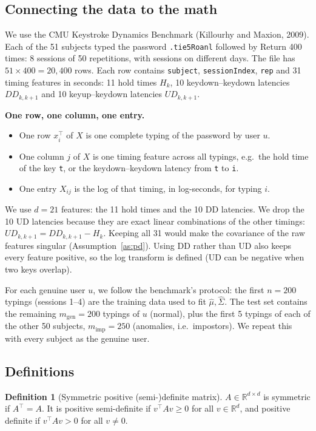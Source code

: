 \documentclass[11pt]{article}
\theoremstyle{definition}
\newtheorem{definition}[theorem]{Definition}
\newcommand{\R}{\mathbb{R}}
\newcommand{\T}{^{\top}}
\begin{document}
\subsection{Connecting the data to the math}
We use the CMU Keystroke Dynamics Benchmark (Killourhy and Maxion, 2009). Each of the 51 subjects typed the password \texttt{.tie5Roanl} followed by Return 400 times: 8 sessions of 50 repetitions, with sessions on different days. The file has $51\times400=20{,}400$ rows. Each row contains \texttt{subject}, \texttt{sessionIndex}, \texttt{rep} and 31 timing features in seconds: 11 hold times $H_k$, 10 keydown--keydown latencies $DD_{k,k+1}$ and 10 keyup--keydown latencies $UD_{k,k+1}$.

\textbf{One row, one column, one entry.}
\begin{itemize}
  \item One row $x_i\T$ of $X$ is one complete typing of the password by user $u$.
  \item One column $j$ of $X$ is one timing feature across all typings, e.g.\ the hold time of the key \texttt{t}, or the keydown--keydown latency from \texttt{t} to \texttt{i}.
  \item One entry $X_{ij}$ is the log of that timing, in log-seconds, for typing $i$.
\end{itemize}

We use $d=21$ features: the 11 hold times and the 10 DD latencies. We drop the 10 UD latencies because they are exact linear combinations of the other timings: $UD_{k,k+1}=DD_{k,k+1}-H_k$. Keeping all 31 would make the covariance of the raw features singular (Assumption~\ref{as:pd}). Using DD rather than UD also keeps every feature positive, so the log transform is defined (UD can be negative when two keys overlap).

For each genuine user $u$, we follow the benchmark's protocol: the first $n=200$ typings (sessions 1--4) are the training data used to fit $\hat\mu,\hat\Sigma$. The test set contains the remaining $m_{\text{gen}}=200$ typings of $u$ (normal), plus the first 5 typings of each of the other 50 subjects, $m_{\text{imp}}=250$ (anomalies, i.e.\ impostors). We repeat this with every subject as the genuine user.

\subsection{Definitions}

\begin{definition}[Symmetric positive (semi-)definite matrix]\label{def:pd}
$A\in\R^{d\times d}$ is symmetric if $A\T=A$. It is positive semi-definite if $v\T Av\ge0$ for all $v\in\R^d$, and positive definite if $v\T Av>0$ for all $v\neq0$.
\end{definition}
\end{document}
